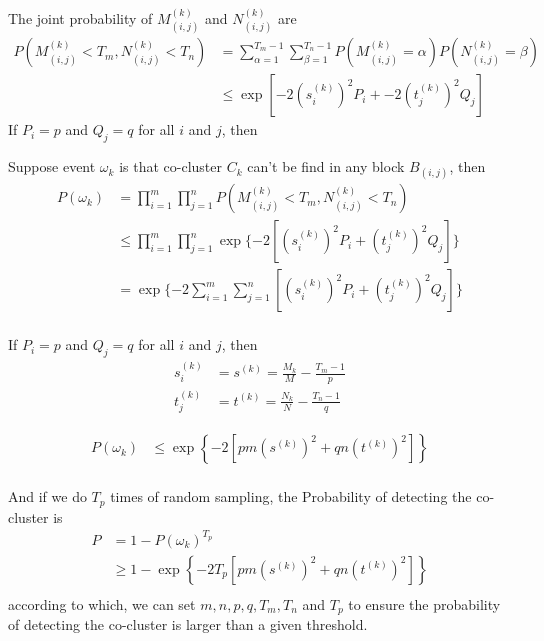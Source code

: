 \documentclass[12pt]{article}
\begin{document}
The joint probability of $M_{(i,j)}^{(k)}$ and $N_{(i,j)}^{(k)}$ are
\begin{align*}
    P(M_{(i,j)}^{(k)} < T_m, N_{(i,j)}^{(k)} < T_n) & = \sum_{\alpha=1}^{T_m-1} \sum_{\beta=1}^{T_n-1} P(M_{(i,j)}^{(k)} = \alpha) P(N_{(i,j)}^{(k)} = \beta) \\
                                                    & \le \exp[-2 (s_i^{(k)})^2 P_i + -2 (t_j^{(k)})^2 Q_j]
\end{align*}
If $P_i = p$ and $Q_j = q$ for all $i$ and $j$, then

Suppose event $\omega_k$ is that co-cluster $C_k$ can't be find in any block $B_{(i,j)}$, then
\begin{align*}
    P(\omega_k) & = \prod_{i=1}^m \prod_{j=1}^n P(M_{(i,j)}^{(k)} < T_m, N_{(i,j)}^{(k)} < T_n)                    \\
                & \le \prod_{i=1}^m \prod_{j=1}^n \exp\{-2 \left[ (s_i^{(k)})^2 P_i + (t_j^{(k)})^2 Q_j \right] \} \\
                & = \exp\{-2 \sum_{i=1}^m \sum_{j=1}^n \left[ (s_i^{(k)})^2 P_i + (t_j^{(k)})^2 Q_j \right] \}     \\
\end{align*}

If $P_i = p$ and $Q_j = q$ for all $i$ and $j$, then
\begin{align*}
    s_i^{(k)} & = s^{(k)} = \frac{M_k}{M}-\frac{T_m-1}{p} \\
    t_j^{(k)} & = t^{(k)} = \frac{N_k}{N}-\frac{T_n-1}{q}
\end{align*}

\begin{align*}
    P(\omega_k) & \le \exp \left\{ -2 [pm (s^{(k)})^2 + qn (t^{(k)})^2] \right\} \\
\end{align*}


And if we do $T_p$ times of random sampling, the Probability of detecting the co-cluster is
\begin{align*}
    P & = 1 - P(\omega_k)^{T_p}                                              \\
      & \ge 1 - \exp \left\{ -2 T_p [pm (s^{(k)})^2 + qn (t^{(k)})^2] \right\} \\
\end{align*}
according to which, we can set $m, n, p, q, T_m, T_n$ and $T_p$ to ensure the probability of detecting the co-cluster is larger than a given threshold.
\end{document}
